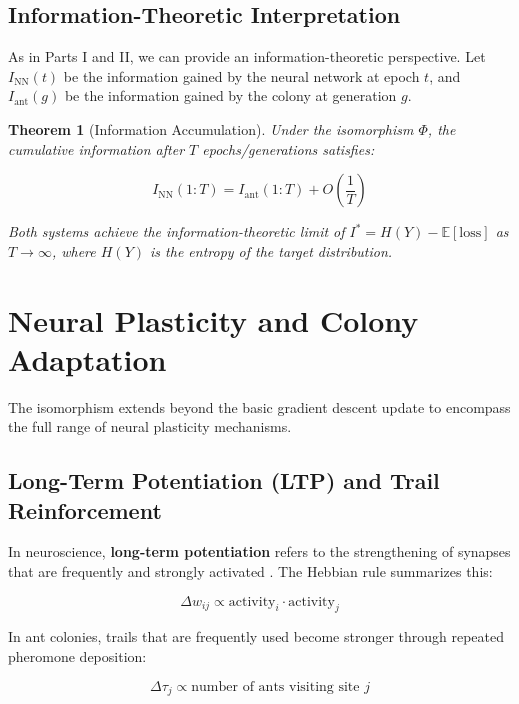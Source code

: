 \documentclass[12pt,letterpaper]{article}
\newtheorem{theorem}{Theorem}[section]
\begin{document}
\subsection{Information-Theoretic Interpretation}

As in Parts I and II, we can provide an information-theoretic perspective. Let $I_{\text{NN}}(t)$ be the information gained by the neural network at epoch $t$, and $I_{\text{ant}}(g)$ be the information gained by the colony at generation $g$.

\begin{theorem}[Information Accumulation]
Under the isomorphism $\Phi$, the cumulative information after $T$ epochs/generations satisfies:

\begin{equation}
I_{\text{NN}}(1:T) = I_{\text{ant}}(1:T) + O\left(\frac{1}{T}\right) \label{eq:info_accum}
\end{equation}

Both systems achieve the information-theoretic limit of $I^* = H(Y) - \mathbb{E}[\text{loss}]$ as $T \to \infty$, where $H(Y)$ is the entropy of the target distribution.
\end{theorem}

\section{Neural Plasticity and Colony Adaptation}

The isomorphism extends beyond the basic gradient descent update to encompass the full range of neural plasticity mechanisms.

\subsection{Long-Term Potentiation (LTP) and Trail Reinforcement}

In neuroscience, \textbf{long-term potentiation} refers to the strengthening of synapses that are frequently and strongly activated \citep{bliss1973long}. The Hebbian rule summarizes this:

\begin{equation}
\Delta w_{ij} \propto \text{activity}_i \cdot \text{activity}_j \label{eq:ltp}
\end{equation}

In ant colonies, trails that are frequently used become stronger through repeated pheromone deposition:

\begin{equation}
\Delta \tau_j \propto \text{number of ants visiting site } j \label{eq:reinforcement}
\end{equation}
\end{document}
